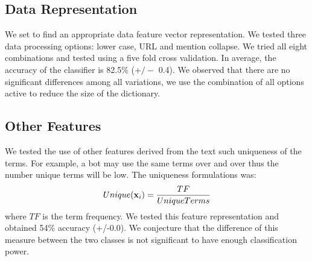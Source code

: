 \subsection{Data Representation}

We set to find an appropriate data feature vector representation. We tested three data processing options: lower case, URL and mention collapse. We tried all eight combinations and tested using a five fold cross validation. In average, the accuracy of the classifier is 82.5\% ($+/-$ 0.4). We observed that there are no significant differences among all variations, we use the combination of all options active to reduce the size of the dictionary. 

%

\subsection{Other Features}
We tested the use of other features derived from the text such uniqueness of the terms. For example, a bot may use the same terms over and over thus the number unique terms will be low. The uniqueness formulations was: 
%
\begin{equation}
Unique({\mathbf x}_i) = \frac{TF}{UniqueTerms}
\end{equation}
%
\noindent where $TF$ is the term frequency. We tested this feature representation and obtained 54\% accuracy (+/-0.0). We conjecture that the difference of this measure between the two classes is not significant to have enough classification power. 

